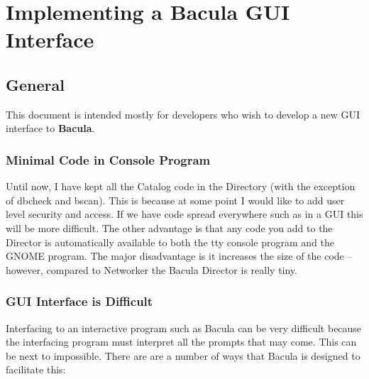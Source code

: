 
\section*{Implementing a Bacula GUI Interface}
\label{_ChapterStart}

\subsection*{General}

This document is intended mostly for developers who wish to develop a new GUI
interface to {\bf Bacula}. 

\subsubsection*{Minimal Code in Console Program}

Until now, I have kept all the Catalog code in the Directory (with the
exception of dbcheck and bscan). This is because at some point I would like to
add user level security and access. If we have code spread everywhere such as
in a GUI this will be more difficult. The other advantage is that any code you
add to the Director is automatically available to both the tty console program
and the GNOME program. The major disadvantage is it increases the size of the
code -- however, compared to Networker the Bacula Director is really tiny. 

\subsubsection*{GUI Interface is Difficult}

Interfacing to an interactive program such as Bacula can be very difficult
because the interfacing program must interpret all the prompts that may come.
This can be next to impossible. There are are a number of ways that Bacula is
designed to facilitate this: 

